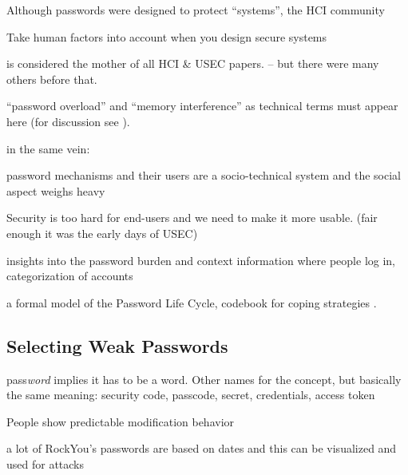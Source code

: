 Although passwords were designed to protect ``systems'', the HCI community


Take human factors into account when you design secure systems \cite{Sasse2005UsableSecurityPosition}


\cite{Adams1999UsersEnemy} is considered the mother of all HCI \& USEC papers. -- but there were many others before that.



``password overload'' and ``memory interference'' as technical terms must appear here (for discussion see \cite{Yang2016MnemonicSentenceBased}).

in the same vein: \cite{Chiasson2009InterferencesGraphical}


password mechanisms and their users are a socio-technical system and the social aspect weighs heavy \cite{Weirich2001PrettyGoodPersuasion}

Security is too hard for end-users and we need to make it more usable. (fair enough it was the early days of USEC) \cite{Dourish2004UserStrategiesEveryday}

insights into the password burden and context information where people log in, categorization of accounts \cite{Hayashi2011DiaryStudyPWs}


a formal model of the Password Life Cycle, codebook for coping strategies \cite{Stobert2014PasswordLifeCycle}.

	\subsection{Selecting Weak Passwords}

	pass\textit{word} implies it has to be a word. Other names for the concept, but basically the same meaning: security code, passcode, secret, credentials, access token
	
	\cite{Jakobsson2013BenefitsUnderstandingPWs}
	
	People show predictable modification behavior \cite{Gaw2005ReuseRecycle}
	
	
	a lot of RockYou's passwords are based on dates and this can be visualized and used for attacks \cite{Veras2012VisualizingSemanticsPasswords}
	
